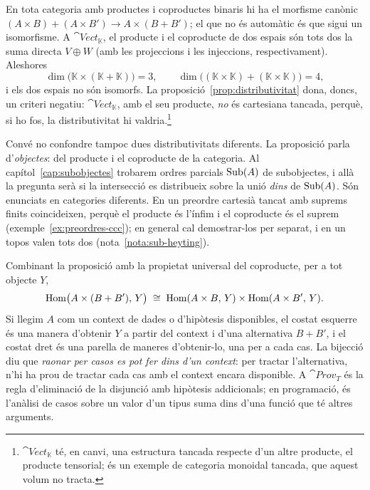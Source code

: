 \begin{observacio}\label{obs:distributivitat-no-automatica}
En tota categoria amb productes i coproductes binaris hi ha el morfisme canònic $(A\times B)+(A\times B')\to A\times(B+B')$; el que no és automàtic és que sigui un isomorfisme. A $\cat{Vect}_{\mathbb K}$, el producte i el coproducte de dos espais són tots dos la suma directa $V\oplus W$ (amb les projeccions i les injeccions, respectivament). Aleshores
\[
\dim\bigl(\mathbb K\times(\mathbb K+\mathbb K)\bigr)=3,
\qquad
\dim\bigl((\mathbb K\times\mathbb K)+(\mathbb K\times\mathbb K)\bigr)=4,
\]
i els dos espais no són isomorfs. La proposició~\ref{prop:distributivitat} dona, doncs, un criteri negatiu: $\cat{Vect}_{\mathbb K}$, amb el seu producte, \emph{no} és cartesiana tancada, perquè, si ho fos, la distributivitat hi valdria.\footnote{$\cat{Vect}_{\mathbb K}$ té, en canvi, una estructura tancada respecte d'un altre producte, el producte tensorial; és un exemple de categoria monoidal tancada, que aquest volum no tracta.}

Convé no confondre tampoc dues distributivitats diferents. La proposició parla d'\emph{objectes}: del producte i el coproducte de la categoria. Al capítol~\ref{cap:subobjectes} trobarem ordres parcials $\operatorname{Sub}(A)$ de subobjectes, i allà la pregunta serà si la intersecció es distribueix sobre la unió \emph{dins} de $\operatorname{Sub}(A)$. Són enunciats en categories diferents. En un preordre cartesià tancat amb suprems finits coincideixen, perquè el producte és l'ínfim i el coproducte és el suprem (exemple~\ref{ex:preordres-ccc}); en general cal demostrar-los per separat, i en un topos valen tots dos (nota~\ref{nota:sub-heyting}).
\end{observacio}

\begin{observacio}
Combinant la proposició amb la propietat universal del coproducte, per a tot objecte $Y$,
\[
\operatorname{Hom}\bigl(A\times(B+B'),\,Y\bigr)\;\cong\;\operatorname{Hom}(A\times B,\,Y)\times\operatorname{Hom}(A\times B',\,Y).
\]
Si llegim $A$ com un context de dades o d'hipòtesis disponibles, el costat esquerre és una manera d'obtenir $Y$ a partir del context i d'una alternativa $B+B'$, i el costat dret és una parella de maneres d'obtenir-lo, una per a cada cas. La bijecció diu que \emph{raonar per casos es pot fer dins d'un context}: per tractar l'alternativa, n'hi ha prou de tractar cada cas amb el context encara disponible. A $\cat{Prov}_T$ és la regla d'eliminació de la disjunció amb hipòtesis addicionals; en programació, és l'anàlisi de casos sobre un valor d'un tipus suma dins d'una funció que té altres arguments.
\end{observacio}

